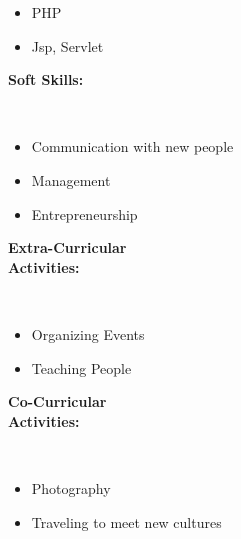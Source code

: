 \documentclass[12pt,a4paper,english]{article}
\begin{document}
\begin{flushleft}
\begin{itemize}
\begin{itemize}
				\item PHP
				\item Jsp, Servlet
			\end{itemize}
		\end{itemize}
		\vspace{1.5in}
		\begin{Large}
			\textbf{Soft Skills:}
		\end{Large}\\
		\begin{itemize}
			\item Communication with new people
			\item Management
			\item Entrepreneurship
		\end{itemize}
		\begin{Large}
			\textbf{Extra-Curricular\\\vspace{0.054in}Activities:}
		\end{Large}\\
		\begin{itemize}
			\begin{itemize}
				\item Organizing Events
				\item Teaching People
			\end{itemize}
		\end{itemize}
		\begin{Large}
			\textbf{Co-Curricular\\\vspace{0.054in}Activities:}
		\end{Large}\\
		\begin{itemize}
			\begin{itemize}
				\item Photography
				\item Traveling to meet new cultures
			\end{itemize}
		\end{itemize}
		\vspace{0.3in}
	\end{flushleft}
	\hline
	\vspace{0.3in}
\end{document}
